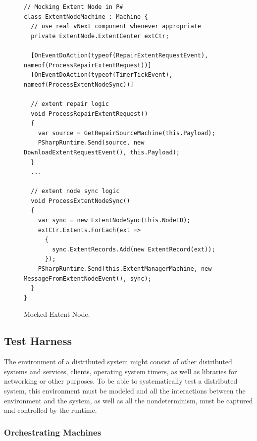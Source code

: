 \begin{figure}[t]
\begin{lstlisting}
// Mocking Extent Node in P#
class ExtentNodeMachine : Machine {
  // use real vNext component whenever appropriate
  private ExtentNode.ExtentCenter extCtr;

  [OnEventDoAction(typeof(RepairExtentRequestEvent), nameof(ProcessRepairExtentRequest))]
  [OnEventDoAction(typeof(TimerTickEvent), nameof(ProcessExtentNodeSync))]

  // extent repair logic
  void ProcessRepairExtentRequest()
  {
    var source = GetRepairSourceMachine(this.Payload);
    PSharpRuntime.Send(source, new DownloadExtentRequestEvent(), this.Payload);
  }
  ...

  // extent node sync logic
  void ProcessExtentNodeSync()
  {
    var sync = new ExtentNodeSync(this.NodeID);
    extCtr.Extents.ForEach(ext =>
      {
        sync.ExtentRecords.Add(new ExtentRecord(ext));
      });
    PSharpRuntime.Send(this.ExtentManagerMachine, new MessageFromExtentNodeEvent(), sync);
  }
}
\end{lstlisting}
\vspace{-2mm}
\caption{Mocked Extent Node.}
\label{fig:mocked_en}
\end{figure}


\subsection{Test Harness}
\label{sec:method:model}

The environment of a distributed system might consist of other distributed systems and services, clients, operating system timers, as well as libraries for networking or other purposes. To be able to systematically test a distributed system, this environment must be modeled and all the interactions between the environment and the system, as well as all the nondeterminism, must be captured and controlled by the \psharp runtime.

\subsubsection{Orchestrating Machines}
\label{sec:method:model:harness}


